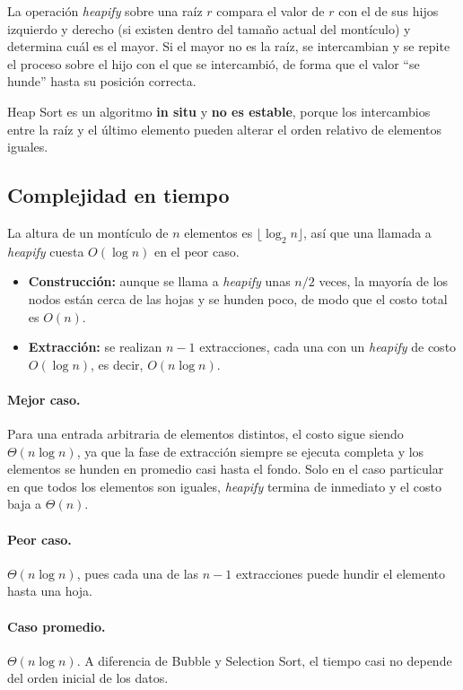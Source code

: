 La operación \emph{heapify} sobre una raíz $r$ compara el valor de $r$ con el de sus hijos izquierdo y derecho (si existen dentro del tamaño actual del montículo) y determina cuál es el mayor. Si el mayor no es la raíz, se intercambian y se repite el proceso sobre el hijo con el que se intercambió, de forma que el valor ``se hunde'' hasta su posición correcta.

Heap Sort es un algoritmo \textbf{in situ} y \textbf{no es estable}, porque los intercambios entre la raíz y el último elemento pueden alterar el orden relativo de elementos iguales.

\subsection{Complejidad en tiempo}

La altura de un montículo de $n$ elementos es $\lfloor \log_2 n \rfloor$, así que una llamada a \emph{heapify} cuesta $O(\log n)$ en el peor caso.

\begin{itemize}
  \item \textbf{Construcción:} aunque se llama a \emph{heapify} unas $n/2$ veces, la mayoría de los nodos están cerca de las hojas y se hunden poco, de modo que el costo total es $O(n)$.
  \item \textbf{Extracción:} se realizan $n-1$ extracciones, cada una con un \emph{heapify} de costo $O(\log n)$, es decir, $O(n \log n)$.
\end{itemize}

\paragraph{Mejor caso.} Para una entrada arbitraria de elementos distintos, el costo sigue siendo $\Theta(n \log n)$, ya que la fase de extracción siempre se ejecuta completa y los elementos se hunden en promedio casi hasta el fondo. Solo en el caso particular en que todos los elementos son iguales, \emph{heapify} termina de inmediato y el costo baja a $\Theta(n)$.

\paragraph{Peor caso.} $\Theta(n \log n)$, pues cada una de las $n-1$ extracciones puede hundir el elemento hasta una hoja.

\paragraph{Caso promedio.} $\Theta(n \log n)$. A diferencia de Bubble y Selection Sort, el tiempo casi no depende del orden inicial de los datos.

